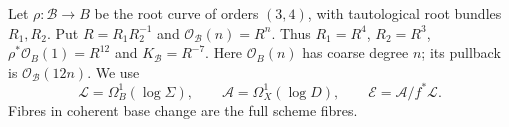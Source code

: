 \begin{definition}
\hypertarget{tag-PI02}{}\label{I:def:root-bundles}
Let $\rho:\mathcal B\to B$ be the root curve of orders $(3,4)$,
with tautological root bundles $R_1,R_2$. Put $R=R_1R_2^{-1}$ and
$\mathcal O_{\mathcal B}(n)=R^n$.
Thus $R_1=R^4$, $R_2=R^3$, $\rho^*\mathcal O_B(1)=R^{12}$ and
$K_{\mathcal B}=R^{-7}$. Here $\mathcal O_B(n)$ has coarse degree $n$;
its pullback is $\mathcal O_{\mathcal B}(12n)$.
We use
\[
 \mathcal L=\Omega_B^1(\log\Sigma),\qquad
 \mathcal A=\Omega_X^1(\log D),\qquad
 \mathcal E=\mathcal A/f^*\mathcal L.
\]
Fibres in coherent base change are the full scheme fibres.
\end{definition}